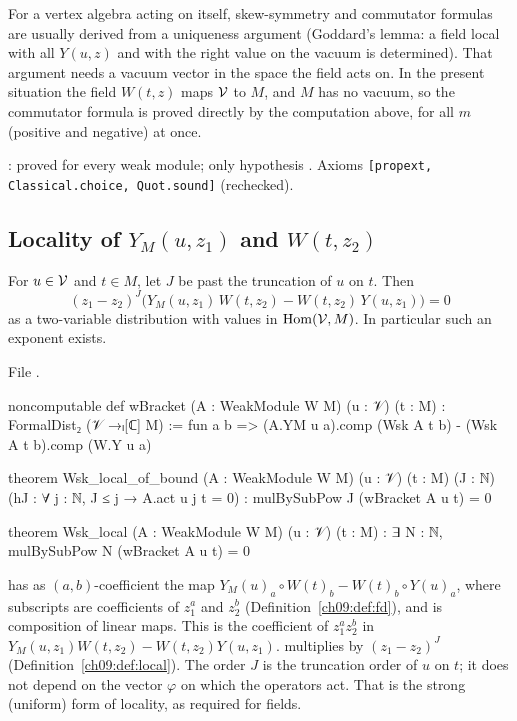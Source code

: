 \begin{remark}\label{ch09:rem:nogoddard}
For a vertex algebra acting on itself, skew-symmetry and commutator formulas are usually derived
from a uniqueness argument (Goddard's lemma: a field local with all $Y(u,z)$ and with the
right value on the vacuum is determined). That argument needs a vacuum vector in the space the
field acts on. In the present situation the field $W(t,z)$ maps $\mathcal{V}$ to $M$, and $M$ has no
vacuum, so the commutator formula is proved directly by the computation above, for all $m$
(positive and negative) at once.
\end{remark}

\begin{status}
: proved for every weak module; only hypothesis . Axioms
\texttt{[propext, Classical.choice, Quot.sound]} (rechecked).
\end{status}

\subsection{Locality of \texorpdfstring{$Y_M(u,z_1)$}{Y\_M(u,z1)} and \texorpdfstring{$W(t,z_2)$}{W(t,z2)}}

\begin{theorem}\label{ch09:thm:Wlocal}
For $u\in\mathcal{V}$ and $t\in M$, let $J$ be past the truncation of $u$ on $t$. Then
\begin{equation*}
(z_1-z_2)^J\Big(Y_M(u,z_1)\,W(t,z_2)-W(t,z_2)\,Y(u,z_1)\Big)=0
\end{equation*}
as a two-variable distribution with values in $\operatorname{Hom}(\mathcal{V},M)$. In particular such
an exponent exists.
\end{theorem}
\noindent File .
\begin{leancode}
noncomputable def wBracket (A : WeakModule W M) (u : 𝒱) (t : M) : FormalDist₂ (𝒱 →ₗ[ℂ] M) :=
  fun a b => (A.YM u a).comp (Wsk A t b) - (Wsk A t b).comp (W.Y u a)

theorem Wsk_local_of_bound (A : WeakModule W M) (u : 𝒱) (t : M) (J : ℕ)
    (hJ : ∀ j : ℕ, J ≤ j → A.act u j t = 0) :
    mulBySubPow J (wBracket A u t) = 0

theorem Wsk_local (A : WeakModule W M) (u : 𝒱) (t : M) :
    ∃ N : ℕ, mulBySubPow N (wBracket A u t) = 0
\end{leancode}

\begin{dictionary}
 has as $(a,b)$-coefficient the map
$Y_M(u)_a\circ W(t)_b-W(t)_b\circ Y(u)_a$, where subscripts are coefficients of $z_1^a$ and
$z_2^b$ (Definition~\ref{ch09:def:fd}), and  is composition of linear maps. This is the
coefficient of $z_1^az_2^b$ in $Y_M(u,z_1)W(t,z_2)-W(t,z_2)Y(u,z_1)$. 
multiplies by $(z_1-z_2)^J$ (Definition~\ref{ch09:def:local}). The order $J$ is the truncation
order of $u$ on $t$; it does not depend on the vector $\varphi$ on which the operators act. That is
the strong (uniform) form of locality, as required for fields.
\end{dictionary}

